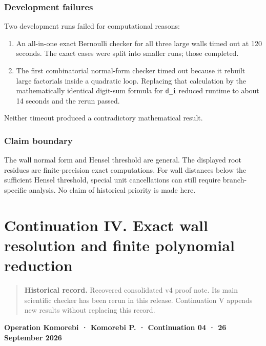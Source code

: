 \documentclass[11pt,letterpaper]{article}
\providecommand{\tightlist}{\setlength{\itemsep}{0pt}\setlength{\parskip}{0pt}}
\begin{document}
\subsubsection{Development failures}\label{development-failures}

Two development runs failed for computational reasons:

\begin{enumerate}
\def\labelenumi{\arabic{enumi}.}
\tightlist
\item
  An all-in-one exact Bernoulli checker for all three large walls timed out at 120 seconds. The exact cases were split into smaller runs; those completed.
\item
  The first combinatorial normal-form checker timed out because it rebuilt large factorials inside a quadratic loop. Replacing that calculation by the mathematically identical digit-sum formula for \texttt{d\_i} reduced runtime to about 14 seconds and the rerun passed.
\end{enumerate}

Neither timeout produced a contradictory mathematical result.

\subsubsection{Claim boundary}\label{claim-boundary}

The wall normal form and Hensel threshold are general. The displayed root residues are finite-precision exact computations. For wall distances below the sufficient Hensel threshold, special unit cancellations can still require branch-specific analysis. No claim of historical priority is made here.

\clearpage

\section{Continuation IV. Exact wall resolution and finite polynomial reduction}\label{continuation-iv.-exact-wall-resolution-and-finite-polynomial-reduction}

\begin{quote}
\textbf{Historical record.} Recovered consolidated v4 proof note. Its main scientific checker has been rerun in this release. Continuation V appends new results without replacing this record.
\end{quote}

\textbf{Operation Komorebi · Komorebi P. · Continuation 04 · 26 September 2026}
\end{document}
